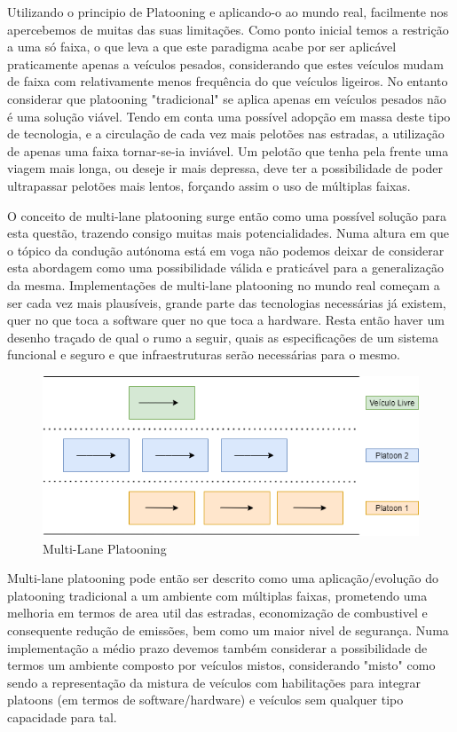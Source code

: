 Utilizando o principio de Platooning e aplicando-o ao mundo real, facilmente nos apercebemos de muitas das suas limitações. Como ponto inicial temos a restrição a uma só faixa, o que leva a que este paradigma acabe por ser aplicável praticamente apenas a veículos pesados, considerando que estes veículos mudam de faixa com relativamente menos frequência do que veículos ligeiros. No entanto considerar que platooning "tradicional" se aplica apenas em veículos pesados não é uma solução viável. Tendo em conta uma possível adopção em massa deste tipo de tecnologia, e a circulação de cada vez mais pelotões nas estradas, a utilização de apenas uma faixa tornar-se-ia inviável. Um pelotão que tenha pela frente uma viagem mais longa, ou deseje ir mais depressa, deve ter a possibilidade de poder ultrapassar pelotões mais lentos, forçando assim o uso de múltiplas faixas.

O conceito de multi-lane platooning surge então como uma possível solução para esta questão, trazendo consigo muitas mais potencialidades. Numa altura em que o tópico da condução autónoma está em voga não podemos deixar de considerar esta abordagem como uma possibilidade válida e praticável para a generalização da mesma. Implementações de multi-lane platooning no mundo real começam a ser cada vez mais plausíveis, grande parte das tecnologias necessárias já existem, quer no que toca a software quer no que toca a hardware. Resta então haver um desenho traçado de qual o rumo a seguir, quais as especificações de um sistema funcional e seguro e que infraestruturas serão necessárias para o mesmo.

\begin{figure}[H]
    \centering
    \includegraphics[scale=0.4]{Images/multilaneplatooning.png}
    \caption{Multi-Lane Platooning}
    \label{fig:my_label}
\end{figure}

Multi-lane platooning pode então ser descrito como uma aplicação/evolução do platooning tradicional a um ambiente com múltiplas faixas, prometendo uma melhoria em termos de area util das estradas, economização de combustivel e consequente redução de emissões, bem como um maior nivel de segurança. Numa implementação a médio prazo devemos também considerar a possibilidade de termos um ambiente composto por veículos mistos, considerando "misto" como sendo a representação da mistura de veículos com habilitações para integrar platoons (em termos de software/hardware) e veículos sem qualquer tipo capacidade para tal.


